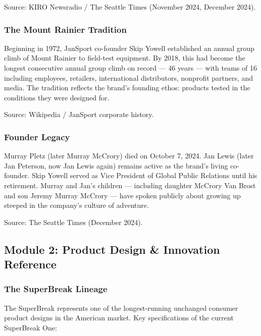 \documentclass[11pt,letterpaper]{article}
\begin{document}
Source: KIRO Newsradio / The Seattle Times (November 2024, December 2024).

\subsubsection{The Mount Rainier Tradition}

Beginning in 1972, JanSport co-founder Skip Yowell established an annual group climb of Mount Rainier to field-test equipment. By 2018, this had become the longest consecutive annual group climb on record --- 46 years --- with teams of 16 including employees, retailers, international distributors, nonprofit partners, and media. The tradition reflects the brand's founding ethos: products tested in the conditions they were designed for.

Source: Wikipedia / JanSport corporate history.

\subsubsection{Founder Legacy}

Murray Pletz (later Murray McCrory) died on October 7, 2024. Jan Lewis (later Jan Peterson, now Jan Lewis again) remains active as the brand's living co-founder. Skip Yowell served as Vice President of Global Public Relations until his retirement. Murray and Jan's children --- including daughter McCrory Van Brost and son Jeremy Murray McCrory --- have spoken publicly about growing up steeped in the company's culture of adventure.

Source: The Seattle Times (December 2024).

\subsection{Module 2: Product Design \& Innovation Reference}

\subsubsection{The SuperBreak Lineage}

The SuperBreak represents one of the longest-running unchanged consumer product designs in the American market. Key specifications of the current SuperBreak One:
\end{document}
